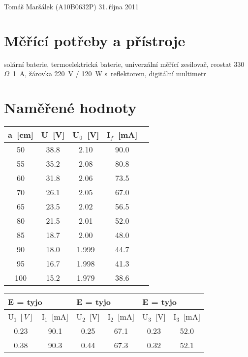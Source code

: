 \documentclass[10pt]{article}
\begin{document}
 {Tomáš Maršálek}
 {(A10B0632P)}
 {31.\,října 2011}


\section{Měřící potřeby a přístroje}
solární baterie, termoelektrická baterie, univerzální měřící zesilovač, reostat
330~$\Omega$~1~A, žárovka 220~V / 120~W s~reflektorem, digitální multimetr

\section{Naměřené hodnoty}

\begin{footnotesize}
\begin{minipage}[t]{.45\textwidth}
\vspace{0pt}
\begin{tabular}[b]{|c|c|c|c||c|}
\hline
a~[cm] & U~[V] & U$_0$~[V] & I$_f$~[mA] & \\
\hline
50  & 38.8 & 2.10  & 90.0 & \\
55  & 35.2 & 2.08  & 80.8 & \\
60  & 31.8 & 2.06  & 73.5 & \\
70  & 26.1 & 2.05  & 67.0 & \\
65  & 23.5 & 2.02  & 56.5 & \\
80  & 21.5 & 2.01  & 52.0 & \\
85  & 18.7 & 2.00  & 48.0 & \\
90  & 18.0 & 1.999 & 44.7 & \\
95  & 16.7 & 1.998 & 41.3 & \\
100 & 15.2 & 1.979 & 38.6 & \\
\hline
\end{tabular}
\end{minipage}
\begin{minipage}[t]{.5\textwidth}
\vspace{0pt}
\begin{tabular}[b]{|c|c|c|c|c|c|}
\hline
\multicolumn{2}{|l|}{E = tyjo} & \multicolumn{2}{l|}{E = tyjo} &
          \multicolumn{2}{l|}{E = tyjo} \\
\hline
U$_1~[V]$ & I$_1$~[mA] & U$_2$~[V] & I$_2$~[mA] & U$_3$~[V] & I$_3$~[mA] \\
\hline
0.23 & 90.1 & 0.25 & 67.1 & 0.23 & 52.0 \\
0.38 & 90.3 & 0.44 & 67.3 & 0.32 & 52.1 \\

\end{tabular}
\end{minipage}
\end{footnotesize}
\end{document}
